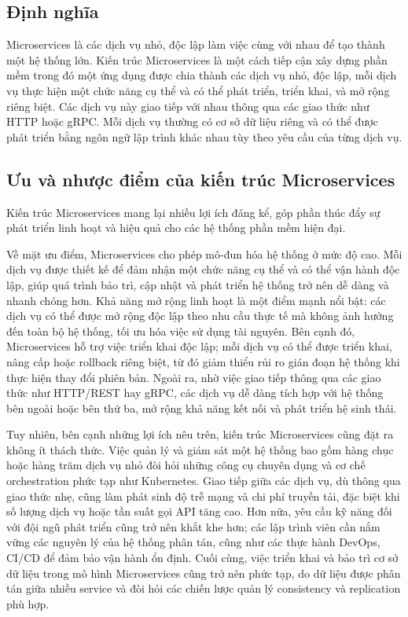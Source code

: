 \documentclass{uetgraduation}
\begin{document}
\subsection{Định nghĩa}
Microservices là các dịch vụ nhỏ, độc lập làm việc cùng với nhau để tạo thành một hệ thống lớn. Kiến trúc Microservices \cite{Microservices} là một cách tiếp cận xây dựng phần mềm trong đó một ứng dụng được chia thành các dịch vụ nhỏ, độc lập, mỗi dịch vụ thực hiện một chức năng cụ thể và có thể phát triển, triển khai, và mở rộng riêng biệt. Các dịch vụ này giao tiếp với nhau thông qua các giao thức như HTTP hoặc gRPC. Mỗi dịch vụ thường có cơ sở dữ liệu riêng và có thể được phát triển bằng ngôn ngữ lập trình khác nhau tùy theo yêu cầu của từng dịch vụ.

\subsection{Ưu và nhược điểm của kiến trúc Microservices}

Kiến trúc Microservices mang lại nhiều lợi ích đáng kể, góp phần thúc đẩy sự phát triển linh hoạt và hiệu quả cho các hệ thống phần mềm hiện đại.

Về mặt ưu điểm, Microservices cho phép mô-đun hóa hệ thống ở mức độ cao. Mỗi dịch vụ được thiết kế để đảm nhận một chức năng cụ thể và có thể vận hành độc lập, giúp quá trình bảo trì, cập nhật và phát triển hệ thống trở nên dễ dàng và nhanh chóng hơn. Khả năng mở rộng linh hoạt là một điểm mạnh nổi bật: các dịch vụ có thể được mở rộng độc lập theo nhu cầu thực tế mà không ảnh hưởng đến toàn bộ hệ thống, tối ưu hóa việc sử dụng tài nguyên. Bên cạnh đó, Microservices hỗ trợ việc triển khai độc lập; mỗi dịch vụ có thể được triển khai, nâng cấp hoặc rollback riêng biệt, từ đó giảm thiểu rủi ro gián đoạn hệ thống khi thực hiện thay đổi phiên bản. Ngoài ra, nhờ việc giao tiếp thông qua các giao thức như HTTP/REST hay gRPC, các dịch vụ dễ dàng tích hợp với hệ thống bên ngoài hoặc bên thứ ba, mở rộng khả năng kết nối và phát triển hệ sinh thái.

Tuy nhiên, bên cạnh những lợi ích nêu trên, kiến trúc Microservices cũng đặt ra không ít thách thức. Việc quản lý và giám sát một hệ thống bao gồm hàng chục hoặc hàng trăm dịch vụ nhỏ đòi hỏi những công cụ chuyên dụng và cơ chế orchestration phức tạp như Kubernetes. Giao tiếp giữa các dịch vụ, dù thông qua giao thức nhẹ, cũng làm phát sinh độ trễ mạng và chi phí truyền tải, đặc biệt khi số lượng dịch vụ hoặc tần suất gọi API tăng cao. Hơn nữa, yêu cầu kỹ năng đối với đội ngũ phát triển cũng trở nên khắt khe hơn; các lập trình viên cần nắm vững các nguyên lý của hệ thống phân tán, cũng như các thực hành DevOps, CI/CD để đảm bảo vận hành ổn định. Cuối cùng, việc triển khai và bảo trì cơ sở dữ liệu trong mô hình Microservices cũng trở nên phức tạp, do dữ liệu được phân tán giữa nhiều service và đòi hỏi các chiến lược quản lý consistency và replication phù hợp.
\end{document}
